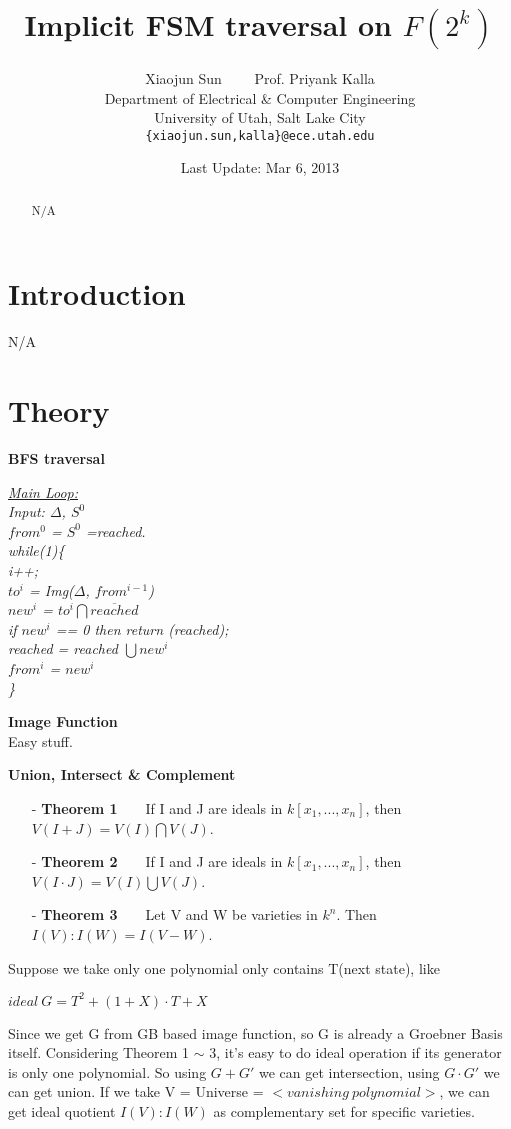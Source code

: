 \documentclass[12pt]{article}
\title{Implicit FSM traversal on $F(2^k)$}
\author{Xiaojun Sun \ \ \ \ Prof. Priyank Kalla\\
\small Department of Electrical \& Computer Engineering\\[-0.8ex]
\small University of Utah, Salt Lake City\\
\small \texttt{\{xiaojun.sun,kalla\}@ece.utah.edu}
}
\date{Last Update: Mar 6, 2013}
\begin{document}
\maketitle

\begin{abstract}
N/A
\end{abstract}

\section{Introduction}

N/A

\section{Theory}
\textbf{BFS traversal}

\textit{\underline{Main Loop:} \\
Input: $\Delta$, $S^0$ \\
$from^0$ = $S^0$ =reached. \\
while(1)\{\\
\indent i++;\\
\indent $to^i$ = Img($\Delta$, $from^{i-1}$)\\
\indent $new^i$ = $to^i\bigcap\overline{reached}$\\
\indent if $new^i$ == 0 then return (reached); \\
\indent reached = reached $\bigcup new^i$\\
\indent $from^i$ = $new^i$ \\
\}\\
}

\textbf{Image Function}
\\ \indent Easy stuff.\par

\textbf{Union, Intersect \& Complement}
\begin{itemize}
\item[-] \textbf{Theorem 1}\ \ \ \ If I and J are ideals in $k[x_1,...,x_n]$, then $V(I+J)=V(I)\bigcap V(J)$.
\item[-] \textbf{Theorem 2}\ \ \ \ If I and J are ideals in $k[x_1,...,x_n]$, then $V(I \cdot J)=V(I)\bigcup V(J)$.
\item[-] \textbf{Theorem 3}\ \ \ \ Let V and W be varieties in $k^n$. Then $I(V):I(W)=I(V-W)$.
\end{itemize}
Suppose we take only one polynomial only contains T(next state), like\\
\hspace{8mm}\par
$ideal\ G = T^2 + (1+X) \cdot T + X$\\
\hspace{8mm}\par
Since we get G from GB based image function, so G is already a Groebner Basis itself.
Considering Theorem 1 $\sim$ 3, it's easy to do ideal operation if its generator is only one polynomial.
So using $G+G'$ we can get intersection, using $G \cdot G'$ we can get union. If we take V = Universe = $<vanishing\ polynomial>$, we can get ideal quotient $I(V):I(W)$ as complementary set for
specific varieties.
\end{document}
